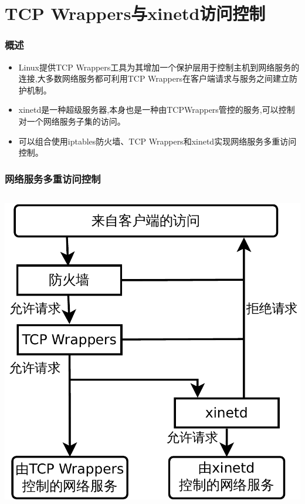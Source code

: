 \documentclass[xcolor=svgnames,presentation]{beamer}
\begin{document}
\section{TCP Wrappers与xinetd访问控制}
\label{sec-7}
\begin{frame}
\frametitle{概述}
\label{sec-7-1}
\begin{itemize}

\item Linux提供TCP Wrappers工具为其增加一个保护层用于控制主机到网络服务的连接,大多数网络服务都可利用TCP Wrappers在客户端请求与服务之间建立防护机制。
\label{sec-7-1-1}%

\item xinetd是一种超级服务器,本身也是一种由TCPWrappers管控的服务,可以控制对一个网络服务子集的访问。
\label{sec-7-1-2}%

\item 可以组合使用iptables防火墙、TCP Wrappers和xinetd实现网络服务多重访问控制。
\label{sec-7-1-3}%
\end{itemize} %
\end{frame}
\begin{frame}
\frametitle{网络服务多重访问控制}
\label{sec-7-2}
\begin{columns}
\begin{column}{0.7\textwidth}
\label{sec-7-2-1}

\begin{center}
\includegraphics[width=.9\linewidth]{img/net-access.pdf}
\end{center}
\end{column}
\end{columns}
\end{frame}
\end{document}
